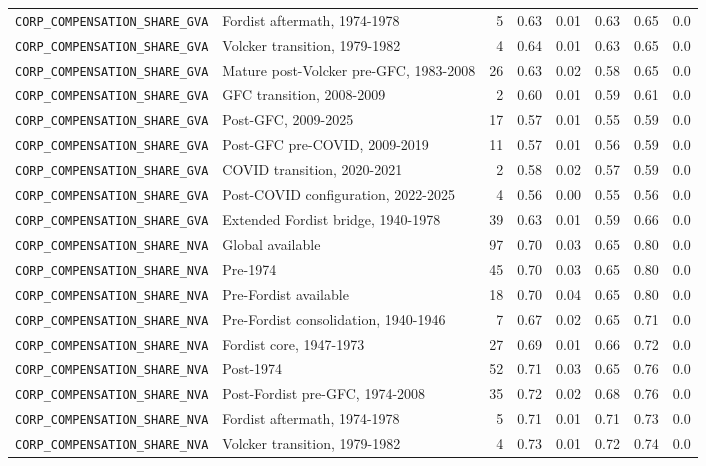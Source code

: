 \begin{landscape}
\begin{longtable}{p{4.4cm}p{3.8cm}rrrrrr}
\\
\nolinkurl{CORP_COMPENSATION_SHARE_GVA} & Fordist aftermath, 1974-1978 & 5 & 0.63 & 0.01 & 0.63 & 0.65 & 0.0
\\
\nolinkurl{CORP_COMPENSATION_SHARE_GVA} & Volcker transition, 1979-1982 & 4 & 0.64 & 0.01 & 0.63 & 0.65 & 0.0
\\
\nolinkurl{CORP_COMPENSATION_SHARE_GVA} & Mature post-Volcker pre-GFC, 1983-2008 & 26 & 0.63 & 0.02 & 0.58 & 0.65 & 0.0
\\
\nolinkurl{CORP_COMPENSATION_SHARE_GVA} & GFC transition, 2008-2009 & 2 & 0.60 & 0.01 & 0.59 & 0.61 & 0.0
\\
\nolinkurl{CORP_COMPENSATION_SHARE_GVA} & Post-GFC, 2009-2025 & 17 & 0.57 & 0.01 & 0.55 & 0.59 & 0.0
\\
\nolinkurl{CORP_COMPENSATION_SHARE_GVA} & Post-GFC pre-COVID, 2009-2019 & 11 & 0.57 & 0.01 & 0.56 & 0.59 & 0.0
\\
\nolinkurl{CORP_COMPENSATION_SHARE_GVA} & COVID transition, 2020-2021 & 2 & 0.58 & 0.02 & 0.57 & 0.59 & 0.0
\\
\nolinkurl{CORP_COMPENSATION_SHARE_GVA} & Post-COVID configuration, 2022-2025 & 4 & 0.56 & 0.00 & 0.55 & 0.56 & 0.0
\\
\nolinkurl{CORP_COMPENSATION_SHARE_GVA} & Extended Fordist bridge, 1940-1978 & 39 & 0.63 & 0.01 & 0.59 & 0.66 & 0.0
\\
\nolinkurl{CORP_COMPENSATION_SHARE_NVA} & Global available & 97 & 0.70 & 0.03 & 0.65 & 0.80 & 0.0
\\
\nolinkurl{CORP_COMPENSATION_SHARE_NVA} & Pre-1974 & 45 & 0.70 & 0.03 & 0.65 & 0.80 & 0.0
\\
\nolinkurl{CORP_COMPENSATION_SHARE_NVA} & Pre-Fordist available & 18 & 0.70 & 0.04 & 0.65 & 0.80 & 0.0
\\
\nolinkurl{CORP_COMPENSATION_SHARE_NVA} & Pre-Fordist consolidation, 1940-1946 & 7 & 0.67 & 0.02 & 0.65 & 0.71 & 0.0
\\
\nolinkurl{CORP_COMPENSATION_SHARE_NVA} & Fordist core, 1947-1973 & 27 & 0.69 & 0.01 & 0.66 & 0.72 & 0.0
\\
\nolinkurl{CORP_COMPENSATION_SHARE_NVA} & Post-1974 & 52 & 0.71 & 0.03 & 0.65 & 0.76 & 0.0
\\
\nolinkurl{CORP_COMPENSATION_SHARE_NVA} & Post-Fordist pre-GFC, 1974-2008 & 35 & 0.72 & 0.02 & 0.68 & 0.76 & 0.0
\\
\nolinkurl{CORP_COMPENSATION_SHARE_NVA} & Fordist aftermath, 1974-1978 & 5 & 0.71 & 0.01 & 0.71 & 0.73 & 0.0
\\
\nolinkurl{CORP_COMPENSATION_SHARE_NVA} & Volcker transition, 1979-1982 & 4 & 0.73 & 0.01 & 0.72 & 0.74 & 0.0

\end{longtable}
\end{landscape}
